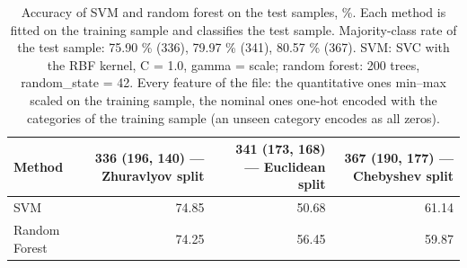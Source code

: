 \begin{table}[htbp]
  \centering
  \caption{Accuracy of SVM and random forest on the test samples, \%. Each method is fitted on the training sample and classifies the test sample. Majority-class rate of the test sample: 75.90 \% (336), 79.97 \% (341), 80.57 \% (367). SVM: SVC with the RBF kernel, C = 1.0, gamma = scale; random forest: 200 trees, random\_state = 42. Every feature of the file: the quantitative ones min--max scaled on the training sample, the nominal ones one-hot encoded with the categories of the training sample (an unseen category encodes as all zeros).}
  \label{tab:table-7}
  \begin{tabular}{lrrr}
    \toprule
    Method & 336 (196, 140) --- Zhuravlyov split & 341 (173, 168) --- Euclidean split & 367 (190, 177) --- Chebyshev split \\
    \midrule
    SVM & 74.85 & 50.68 & 61.14 \\
    Random Forest & 74.25 & 56.45 & 59.87 \\
    \bottomrule
  \end{tabular}
\end{table}
